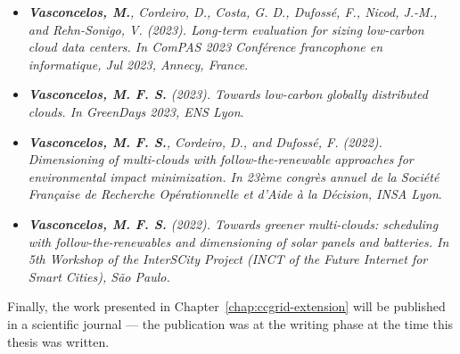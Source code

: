 \begin{itemize}

\item \textit{\textbf{Vasconcelos, M.}, Cordeiro, D., Costa, G. D., Dufossé, F., Nicod, J.-M., and Rehn-Sonigo, V. (2023). Long-term evaluation for sizing low-carbon cloud data centers. In ComPAS 2023 Conférence francophone en informatique, Jul 2023, Annecy, France}.

  \item  \textit{\textbf{Vasconcelos, M. F. S.} (2023). Towards low-carbon globally distributed clouds. In GreenDays 2023, ENS Lyon}.

\item  \textit{\textbf{Vasconcelos, M. F. S.}, Cordeiro, D., and Dufossé, F. (2022). Dimensioning of multi-clouds with follow-the-renewable approaches for environmental impact minimization. In 23ème congrès annuel de la Société Française de Recherche Opérationnelle et d’Aide à la Décision, INSA Lyon}.

\item  \textit{\textbf{Vasconcelos, M. F. S.} (2022). Towards greener multi-clouds: scheduling with follow-the-renewables and dimensioning of solar panels and batteries. In 5th Workshop of the InterSCity Project (INCT of the Future Internet for Smart Cities), São Paulo.}

\end{itemize}

Finally, the work presented in Chapter~\ref{chap:ccgrid-extension} will be published in a scientific journal --- the publication was at the writing phase at the time this thesis was written.